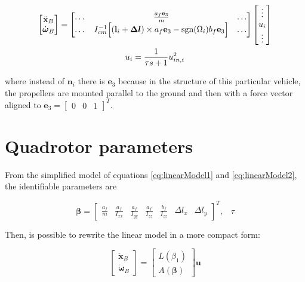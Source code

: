 \begin{gather}
	\begin{bmatrix}
		\ddot{\mathbf{x}}_B \\
		\dot{\boldsymbol{\omega}}_B
	\end{bmatrix}
	=
	\begin{bmatrix}
		\dots & \frac{a_f \mathbf{e}_3}{m} & \dots \\
		\dots & I_{cm}^{-1}\Big[(\mathbf{l}_i+\boldsymbol{\Delta l})\times a_f\mathbf{e}_3-\operatorname*{sgn}(\Omega_i)b_f\mathbf{e}_3\Big] & \dots 
	\end{bmatrix}
	\begin{bmatrix}
		\vdots \\
		u_i \\
		\vdots
	\end{bmatrix} 
	\label{eq:linearModel1}\\
	u_i = \frac{1}{\tau s+1}u_{in,i}^2
	\label{eq:linearModel2}
\end{gather}

\noindent where instead of $\mathbf{n}_i$ there is $\mathbf{e}_3$ because in the structure of this particular vehicle, the propellers are mounted parallel to the ground and then with a force vector aligned to $\mathbf{e}_3=\begin{bmatrix}0 & 0 & 1\end{bmatrix}^T$.


\section{Quadrotor parameters}
\label{quadParameters}

From the simplified model of equations \eqref{eq:linearModel1} and \eqref{eq:linearModel2}, the identifiable parameters are 

\begin{equation}
	\boldsymbol{\beta} =
	\begin{bmatrix}
		\frac{a_f}{m} & \frac{a_f}{I_{xx}} & \frac{a_f}{I_{yy}} & \frac{a_f}{I_{zz}} & \frac{b_f}{I_{zz}} & \Delta l_x & \Delta l_y 
	\end{bmatrix}^T, \hspace{10pt} \tau
	\label{eq:parameters}
\end{equation}

\noindent Then, is possible to rewrite the linear model in a more compact form:

\begin{equation}
	\begin{bmatrix}
		\ddot{\mathbf{x}}_B \\
		\dot{\boldsymbol{\omega}}_B
	\end{bmatrix}
	=
	\begin{bmatrix}
		L(\beta_1) \\
		A(\boldsymbol{\beta})
	\end{bmatrix}
	\mathbf{u}
	\label{eq:linearCompact}
\end{equation}


